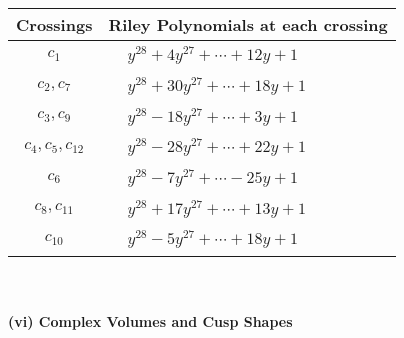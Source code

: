 \documentclass[1p]{elsarticle_modified}
\theoremstyle{definition}
\begin{document}
\begin{tabular}{m{50pt}|m{274pt}}
Crossings & \hspace{64pt}Riley Polynomials at each crossing \\
\hline $$\begin{aligned}c_{1}\end{aligned}$$&$\begin{aligned}
&y^{28}+4 y^{27}+\cdots+12 y+1
\end{aligned}$\\
\hline $$\begin{aligned}c_{2},c_{7}\end{aligned}$$&$\begin{aligned}
&y^{28}+30 y^{27}+\cdots+18 y+1
\end{aligned}$\\
\hline $$\begin{aligned}c_{3},c_{9}\end{aligned}$$&$\begin{aligned}
&y^{28}-18 y^{27}+\cdots+3 y+1
\end{aligned}$\\
\hline $$\begin{aligned}c_{4},c_{5},c_{12}\end{aligned}$$&$\begin{aligned}
&y^{28}-28 y^{27}+\cdots+22 y+1
\end{aligned}$\\
\hline $$\begin{aligned}c_{6}\end{aligned}$$&$\begin{aligned}
&y^{28}-7 y^{27}+\cdots-25 y+1
\end{aligned}$\\
\hline $$\begin{aligned}c_{8},c_{11}\end{aligned}$$&$\begin{aligned}
&y^{28}+17 y^{27}+\cdots+13 y+1
\end{aligned}$\\
\hline $$\begin{aligned}c_{10}\end{aligned}$$&$\begin{aligned}
&y^{28}-5 y^{27}+\cdots+18 y+1
\end{aligned}$\\
\hline
\end{tabular}\\~\\
\newpage\flushleft \textbf{(vi) Complex Volumes and Cusp Shapes}
\end{document}
